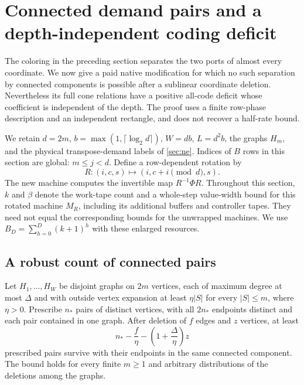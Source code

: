 \section{Connected demand pairs and a depth-independent coding deficit}
\label{sec:cd}

The coloring in the preceding section separates the two ports of almost
every coordinate.  We now give a paid native modification for which no
such separation by connected components is possible after a sublinear
coordinate deletion.  Nevertheless its full cone relations have a
positive all-code deficit whose coefficient is independent of the depth.
The proof uses a finite row-phase description and an independent rectangle,
and does not recover a half-rate bound.

We retain $d=2m$, $b=\max(1,\lceil\log_2d\rceil)$, $W=db$, $L=d^2b$,
the graphs $H_m$, and the physical transpose-demand labels of
\cref{sec:ne}.  Indices of $B$ rows in this section are global:
$m\le j<d$.  Define a row-dependent rotation by
\[
 R:(i,c,s)\longmapsto(i,c+i\pmod d,s).
\]
The new machine computes the invertible map $R^{-1}\Phi R$.
Throughout this section, $k$ and $\beta$ denote the work-tape count and a
whole-step value-width bound for this rotated machine $M_R$, including
its additional buffers and controller tapes.  They need not equal the
corresponding bounds for the unwrapped machines.  We use
$B_D=\sum_{h=0}^{D}(k+1)^h$ with these enlarged resources.

\subsection{A robust count of connected pairs}

\begin{lemma}
\label{lem:cd-connected-pairs}
Let $H_1,\ldots,H_W$ be disjoint graphs on $2m$ vertices, each of maximum
degree at most $\Delta$ and with outside vertex expansion at least
$\eta|S|$ for every $|S|\le m$, where $\eta>0$.  Prescribe $n_*$ pairs of distinct
vertices, with all $2n_*$ endpoints distinct and each pair contained in
one graph.  After deletion of $f$ edges and $z$ vertices, at least
\[
 n_*-\frac f\eta-\left(1+\frac\Delta\eta\right)z
\]
prescribed pairs survive with their endpoints in the same connected
component.  The bound holds for every finite $m\ge1$ and arbitrary
distributions of the deletions among the graphs.
\end{lemma}

